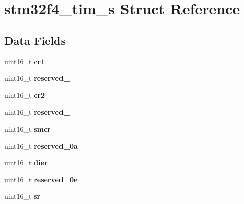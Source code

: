 \hypertarget{structstm32f4__tim__s}{}\section{stm32f4\+\_\+tim\+\_\+s Struct Reference}
\label{structstm32f4__tim__s}
\subsection*{Data Fields}
\begin{DoxyCompactItemize}
\item 
\mbox{\label{structstm32f4__tim__s_a3f6cef5c7a2f8d7328cc04c978767767}} 
uint16\+\_\+t {\bfseries cr1}
\item 
\mbox{\label{structstm32f4__tim__s_a9f32a12a0d4267cab44a2d847d5e077e}} 
uint16\+\_\+t {\bfseries reserved\+\_}
\item 
\mbox{\label{structstm32f4__tim__s_a94c16b9479349aa2f4f9940772da6976}} 
uint16\+\_\+t {\bfseries cr2}
\item 
\mbox{\label{structstm32f4__tim__s_a3ca03d6c3d314b14d70eb7ad80f5c15b}} 
uint16\+\_\+t {\bfseries reserved\+\_}
\item 
\mbox{\label{structstm32f4__tim__s_ae9b03ec69a6a47034e09373d989c721a}} 
uint16\+\_\+t {\bfseries smcr}
\item 
\mbox{\label{structstm32f4__tim__s_a6fd50e94c642d4a688039ebc2ee8a33a}} 
uint16\+\_\+t {\bfseries reserved\+\_\+0a}
\item 
\mbox{\label{structstm32f4__tim__s_ae6a31224c9750a0c05ba3cf837e72a41}} 
uint16\+\_\+t {\bfseries dier}
\item 
\mbox{\label{structstm32f4__tim__s_ad117854e7cf96cf6bb13513d7445541d}} 
uint16\+\_\+t {\bfseries reserved\+\_\+0e}
\item 
\mbox{\label{structstm32f4__tim__s_a9a3651097dc64022a81bb24aada9f0b8}} 
uint16\+\_\+t {\bfseries sr}
\item 

\end{DoxyCompactItemize}
